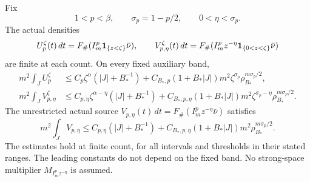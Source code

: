 \begin{theorem}\label{thm:v86-moments}
Fix
\[
 1<p<\beta,\qquad \sigma_p=1-p/2,\qquad 0<\eta<\sigma_p.
\]
The actual densities
\[
 U_p^\zeta(t)\,dt=F_\#(I_m^p\mathbf1_{\{z<\zeta\}}\bar\nu),\qquad
 V_{p,\eta}^\zeta(t)\,dt
       =F_\#(I_m^p z^{-\eta}\mathbf1_{\{0<z<\zeta\}}\bar\nu)
\]
are finite at each count. On every fixed auxiliary band,
\begin{align}
 m^2\int_J U_p^\zeta
 &\le C_p\zeta^\alpha(|J|+B_*^{-1})
 +C_{B_*,p}(1+B_*|J|)m^2
                 \zeta^{\sigma_p}\rho_{B_*}^{m\sigma_p/2},
                                            \label{eq:v86-moment-finite}\\
 m^2\int_J V_{p,\eta}^\zeta
 &\le C_{p,\eta}\zeta^{\alpha-\eta}(|J|+B_*^{-1})
 +C_{B_*,p,\eta}(1+B_*|J|)m^2
            \zeta^{\sigma_p-\eta}\rho_{B_*}^{m\sigma_p/2}.
                                            \label{eq:v86-mixed-finite}
\end{align}
The unrestricted actual source
$V_{p,\eta}(t)\,dt=F_\#(I_m^p z^{-\eta}\bar\nu)$ satisfies
\begin{equation}\label{eq:v86-full-moment}
 m^2\int_J V_{p,\eta}
 \le C_{p,\eta}(|J|+B_*^{-1})
 +C_{B_*,p,\eta}(1+B_*|J|)m^2\rho_{B_*}^{m\sigma_p/2}.
\end{equation}
The estimates hold at finite count, for all intervals and thresholds
in their stated ranges. The leading constants do not depend on the
fixed band. No strong-space multiplier $M_{I_m^pz^{-\eta}}$ is assumed.
\end{theorem}

